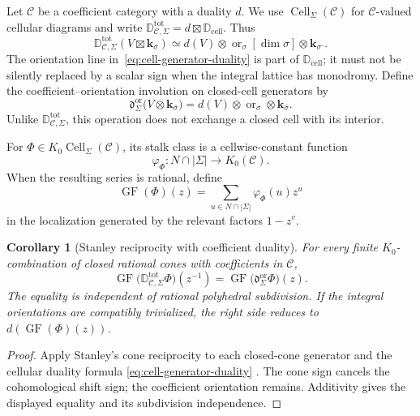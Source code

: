 \documentclass[11pt]{article}
\newtheorem{corollary}[theorem]{Corollary}
\theoremstyle{definition}
\theoremstyle{remark}
\newcommand{\cC}{\mathcal C}
\newcommand{\D}{\mathbb D}
\newcommand{\Dcell}{\mathbb D_{\mathrm{cell}}}
\newcommand{\GF}{\operatorname{GF}}
\newcommand{\Cell}{\operatorname{Cell}}
\begin{document}
Let $\cC$ be a coefficient category with a duality $d$.  We use
$\Cell_\Sigma(\cC)$ for $\cC$-valued cellular diagrams and write
$\D^{\mathrm{tot}}_{\cC,\Sigma}=d\boxtimes\Dcell$.  Thus
\[
 \D^{\mathrm{tot}}_{\cC,\Sigma}
 (V\boxtimes\mathbf k_{\bar\sigma})
 \simeq
 d(V)\otimes\operatorname{or}_\sigma[\dim\sigma]
 \otimes\mathbf k_{\sigma^\circ}.
\]
The orientation line in~\eqref{eq:cell-generator-duality} is part of
$\Dcell$; it must not be
silently replaced by a scalar sign when the integral lattice has monodromy.
Define the coefficient--orientation involution on closed-cell generators by
\begin{equation}
 \mathfrak d^{\operatorname{or}}_\Sigma
 \bigl(V\otimes\mathbf k_{\bar\sigma}\bigr)
 =d(V)\otimes\operatorname{or}_\sigma
  \otimes\mathbf k_{\bar\sigma}.
 \label{eq:coefficient-orientation-duality}
\end{equation}
Unlike $\D^{\mathrm{tot}}_{\cC,\Sigma}$, this operation does not exchange a closed cell with
its interior.

For $\Phi\in K_0\Cell_\Sigma(\cC)$, its stalk class is a cellwise-constant
function
\[
 \varphi_\Phi:N\cap|\Sigma|\longrightarrow K_0(\cC).
\]
When the resulting series is rational, define
\begin{equation}
 \GF(\Phi)(z)=
 \sum_{u\in N\cap|\Sigma|}\varphi_\Phi(u)z^u
 \label{eq:GF-definition}
\end{equation}
in the localization generated by the relevant factors $1-z^v$.

\begin{corollary}[Stanley reciprocity with coefficient duality]
\label{thm:GF-duality}
For every finite $K_0$-combination of closed rational cones with coefficients
in $\cC$,
\begin{equation}
 \boxed{
 \GF\bigl(\D^{\mathrm{tot}}_{\cC,\Sigma}\Phi\bigr)(z^{-1})
 =\GF\bigl(\mathfrak d^{\operatorname{or}}_\Sigma\Phi\bigr)(z).}
 \label{eq:GF-duality}
\end{equation}
The equality is independent of rational polyhedral subdivision.
If the integral orientations are compatibly trivialized, the right side
reduces to $d(\GF(\Phi)(z))$.
\end{corollary}

\begin{proof}
Apply Stanley's cone reciprocity \cite{Stanley} to each closed-cone
generator and the cellular duality formula
\eqref{eq:cell-generator-duality} \cite{Curry,CurryErratum,BresslerLunts}.
The cone sign cancels the cohomological shift sign; the coefficient
orientation remains.  Additivity gives the displayed equality and its
subdivision independence.
\end{proof}
\end{document}
